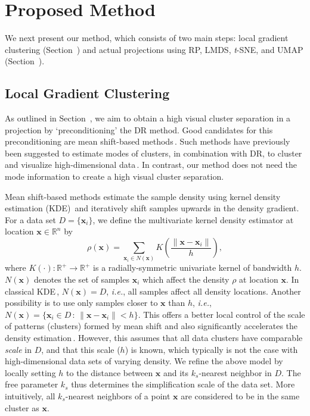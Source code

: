 \documentclass[sagev,Afour,times]{sagej}
\begin{document}

\section{Proposed Method}
\label{sec:method}
%
We next present our method, which consists of two main steps: local gradient clustering (Section~) and actual projections using RP, LMDS, \emph{t}-SNE, and UMAP (Section~).

\subsection{Local Gradient Clustering}
\label{sec:method:lgc}
%
As outlined in Section~, we aim to obtain a high visual cluster separation in a projection by `preconditioning' the DR method. Good candidates for this preconditioning are mean shift-based methods\,\cite{gc1975,gc1995,ms,ms2007,alex1}. Such methods have previously been suggested to estimate modes of clusters, in combination with DR, to cluster and visualize high-dimensional data\,\cite{realworld:banknote_sep}. In contrast, our method does not need the mode information to create a high visual cluster separation.
 
 Mean shift-based methods estimate the sample density using kernel density estimation (KDE)\,\cite{kde1} and iteratively shift samples upwards in the density gradient. For a data set $D=\{\mathbf{x}_i\}$, we define the multivariate kernel density estimator at location $\mathbf{x} \in \mathbb{R}^n$ by
%
\begin{equation}
\label{Eq1}
	\rho(\mathbf{x}) = \sum_{\mathbf{x}_i \in N(\mathbf{x})} K\left(\frac{\|\mathbf{x}-\mathbf{x}_i\|}{h}\right),
\end{equation}
%
where $K(\cdot) : \mathbb{R}^{+} \rightarrow \mathbb{R}^{+}$ is a radially-symmetric univariate kernel of bandwidth $h$. $N(\mathbf{x})$ denotes the set of samples $\mathbf{x}_i$ which affect the density $\rho$ at location $\mathbf{x}$. In classical KDE\,\cite{gc1975}, $N(\mathbf{x})=D$, \emph{i.e.}, all samples affect all density locations. Another possibility is to use only samples closer to $\mathbf{x}$ than $h$, \emph{i.e.}, $N(\mathbf{x}) = \{\mathbf{x}_i \in D\,:\,\| \mathbf{x} - \mathbf{x}_i \| < h \}$. This offers a better local control of the scale of patterns (clusters) formed by mean shift and also significantly accelerates the density estimation\,\cite{alex1}. However, this assumes that all data clusters have comparable \emph{scale} in $D$, and that this scale ($h$) is known, which typically is not the case with high-dimensional data sets of varying density. We refine the above model by locally setting $h$ to the distance between $\mathbf{x}$ and its $k_s$-nearest neighbor in $D$. The free parameter $k_s$ thus determines the simplification scale of the data set. More intuitively, all $k_s$-nearest neighbors of a point $\mathbf{x}$ are considered to be in the same cluster as $\mathbf{x}$.
\end{document}
